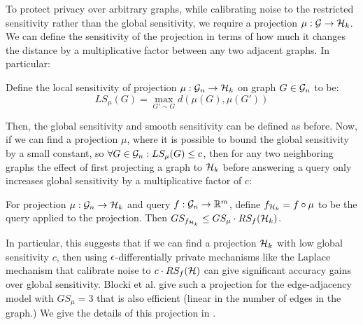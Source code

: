 To protect privacy over arbitrary graphs, while calibrating noise to the restricted sensitivity rather than the global sensitivity, we require a projection $\mu: \mathcal{G} \to \mathcal{H}_k$. We can define the sensitivity of the projection in terms of how much it changes the distance by a multiplicative factor between any two adjacent graphs. In particular:

\begin{definition}
Define the local sensitivity of projection $\mu: \mathcal{G}_n\to \mathcal{H}_k$ on graph $G \in \mathcal{G}_n$ to be:
$$LS_\mu(G) = \max_{G' \sim G} d(\mu(G), \mu(G' )) $$ 
\end{definition} 



Then, the global sensitivity and smooth sensitivity can be defined as before. Now, if we can find a projection $\mu$, where it is possible to bound the global sensitivity by a small constant, so $\forall G \in \mathcal{G}_n: LS_{\mu} (G)\leq c$, then for any two neighboring graphs the effect of first projecting a graph to $\mathcal{H}_k$ before answering a query only increases global sensitivity by a multiplicative factor of $c$:

\begin{lemma}
\label{lemma:restricted_sensitivity_edge}
For projection $\mu: \mathcal{G} _n\to \mathcal{H}_k$ and query $f: \mathcal{G}_n \to \mathbb{R}^m$, define $f_{\mathcal{H}_k} = f \circ \mu$ to be the query applied to the projection. Then $GS_{f_{\mathcal{H}_k}} \leq GS_{\mu} \cdot RS_f(\mathcal{H}_k)$.
\end{lemma}
In particular, this suggests that if we can find a projection $\mathcal{H}_k$ with low global sensitivity $c$, then using $\epsilon$-differentially private mechanisms like the Laplace mechanism that calibrate noise to $c \cdot RS_f(\mathcal{H})$ can give significant accuracy gains over global sensitivity. Blocki et al. give such a projection for the edge-adjacency model with $GS_\mu = 3$ that is also efficient (linear in the number of edges in the graph.) We give the details of this projection in .

